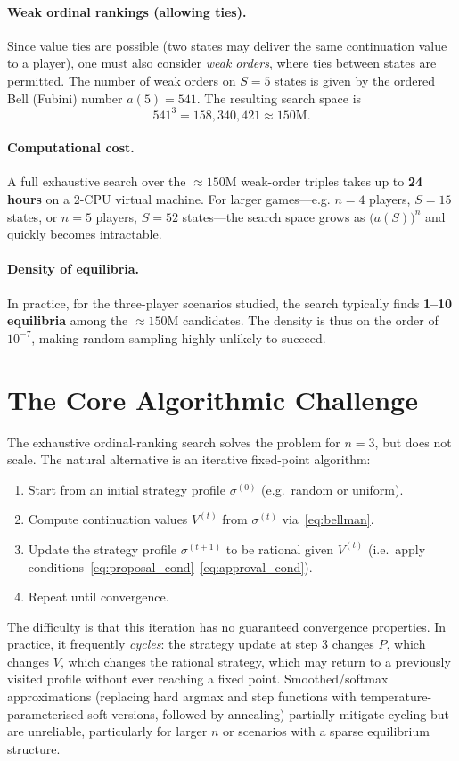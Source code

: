 \documentclass[11pt]{article}
\begin{document}
\paragraph{Weak ordinal rankings (allowing ties).} Since value ties are possible (two states
may deliver the same continuation value to a player), one must also consider \emph{weak orders},
where ties between states are permitted. The number of weak orders on $S=5$ states is given by
the ordered Bell (Fubini) number $a(5) = 541$. The resulting search space is
\[
  541^3 = 158{,}340{,}421 \approx 150\text{M}.
\]

\paragraph{Computational cost.} A full exhaustive search over the $\approx 150$M weak-order
triples takes up to \textbf{24 hours} on a 2-CPU virtual machine. For larger games---e.g. $n = 4$ players, $S = 15$ states, or $n = 5$
players, $S = 52$ states---the search space grows as $\bigl(a(S)\bigr)^n$ and quickly becomes
intractable.

\paragraph{Density of equilibria.} In practice, for the three-player scenarios studied, the
search typically finds \textbf{1--10 equilibria} among the $\approx 150$M candidates. The density
is thus on the order of $10^{-7}$, making random sampling highly unlikely to succeed.

\section{The Core Algorithmic Challenge}

The exhaustive ordinal-ranking search solves the problem for $n = 3$, but does not scale. The
natural alternative is an iterative fixed-point algorithm:
\begin{enumerate}
  \item Start from an initial strategy profile $\sigma^{(0)}$ (e.g.\ random or uniform).
  \item Compute continuation values $V^{(t)}$ from $\sigma^{(t)}$ via~\eqref{eq:bellman}.
  \item Update the strategy profile $\sigma^{(t+1)}$ to be rational given $V^{(t)}$
    (i.e.\ apply conditions~\eqref{eq:proposal_cond}--\eqref{eq:approval_cond}).
  \item Repeat until convergence.
\end{enumerate}
The difficulty is that this iteration has no guaranteed convergence properties. In practice, it
frequently \emph{cycles}: the strategy update at step 3 changes $P$, which changes $V$, which
changes the rational strategy, which may return to a previously visited profile without ever
reaching a fixed point. Smoothed/softmax approximations (replacing hard argmax and step functions
with temperature-parameterised soft versions, followed by annealing) partially mitigate cycling
but are unreliable, particularly for larger $n$ or scenarios with a sparse equilibrium structure.
\end{document}
